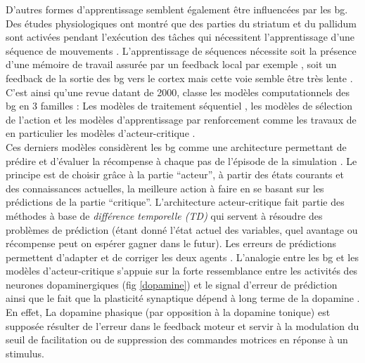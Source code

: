 D'autres formes d'apprentissage semblent également être influencées par les \gls{bg}. Des études physiologiques ont montré que des parties du striatum et du pallidum sont activées pendant l'exécution des tâches qui nécessitent l'apprentissage d'une séquence de mouvements \cite{Kermadi:1995, Cromwell:1996,Berns:1998}. L'apprentissage de séquences nécessite soit la présence d'une mémoire de travail assurée par un feedback local par exemple \cite{Smith:1994}, soit un feedback de la sortie des \gls{bg} vers le cortex mais cette voie semble être très lente \cite{Alexander:1986,Hedreen:1991}. C'est ainsi qu'une revue datant de 2000, \cite{Gillies:2000} classe les modèles computationnels des \gls{bg} en 3 familles : Les modèles de traitement séquentiel \cite{Berns:1998}, les modèles de sélection de l'action \cite{Gurney:2001a} et les modèles d'apprentissage par renforcement comme les travaux de \cite{Schultz:2000a, Schultz:2000b} en particulier les modèles d'acteur-critique \cite{Barto:1995,Houk:1995,Brown:1999,Suri:2001,Suri:1998,Contreras:1999}.\\

Ces derniers modèles considèrent les \gls{bg} comme une architecture permettant de prédire et d'évaluer la récompense à chaque pas de l'épisode de la simulation \cite{Joel:2002,Niv:2001}. Le principe est de choisir grâce à la partie ``acteur'', à partir des états courants et des connaissances actuelles, la meilleure action à faire en se basant sur les prédictions de la partie ``critique''. L'architecture acteur-critique fait partie des méthodes à base de \textit{différence temporelle (TD)} \cite{Samuel:2000,Klopf:1972,Sutton:1988, Houk:1995,Joel:2002} qui servent à résoudre des problèmes de prédiction (étant donné l'état actuel des variables, quel avantage ou récompense peut on espérer gagner dans le futur). Les erreurs de prédictions permettent d'adapter et de corriger les deux agents \cite{Sutton:1998}. L'analogie entre les \gls{bg} et les modèles d'acteur-critique s'appuie sur la forte ressemblance entre les activités des neurones dopaminergiques (fig \ref{dopamine}) et le signal d'erreur de prédiction ainsi que le fait que la plasticité synaptique dépend à long terme de la dopamine \cite{Calabresi:2000,Wickens:1996}. En effet, La dopamine phasique (par opposition à la dopamine tonique) est supposée résulter de l'erreur dans le feedback moteur et servir à la modulation du seuil de facilitation ou de suppression des commandes motrices en réponse à un stimulus.\\
 
